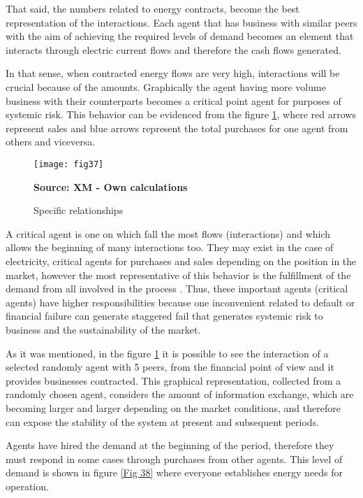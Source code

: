 \documentclass[12pt]{book}
\begin{document}
That said, the numbers related to energy contracts, become the best representation of the interactions. Each agent that has business with similar peers with the aim of achieving the required levels of demand becomes an element that interacts through electric current flows and therefore the cash flows generated.

In that sense, when contracted energy flows are very high, interactions will be crucial because of the amounts. Graphically the agent having more volume business with their counterparts becomes a critical point agent for purposes of systemic risk. This behavior can be evidenced from the figure \ref {Fig 37}, where red arrows represent sales and blue arrows represent the total purchases for one agent from others and viceversa. 

\begin{figure}  
\centering    
\texttt{[image: fig37]}  
\caption{Specific relationships}
\scriptsize 
\textbf{Source: XM - Own calculations}
\captionsetup{justification=centering,margin=1cm}   
\label{Fig 37}
\end{figure}

A critical agent is one on which fall the most flows (interactions) and which allows the beginning of many interactions too. They may exist in the case of electricity, critical agents for purchases and sales depending on the position in the market, however the most representative of this behavior is the fulfillment of the demand from all involved in the process \cite{costa2007}. Thus, these important agents (critical agents) have higher responsibilities because one inconvenient related to default or financial failure can generate staggered fail that generates systemic risk to business and the sustainability of the market.

As it was mentioned, in the figure \ref {Fig 37} it is possible to see the interaction of a selected randomly agent with 5 peers, from the financial point of view and it provides businesses contracted. This graphical representation, collected from a randomly chosen agent, considers the amount of information exchange, which are becoming larger and larger depending on the market conditions, and therefore can expose the stability of the system at present and subsequent periods.

Agents have hired the demand at the beginning of the period, therefore they must respond in some cases through purchases from other agents. This level of demand is shown in figure \ref{Fig 38} where everyone establishes energy needs for operation.
\end{document}
